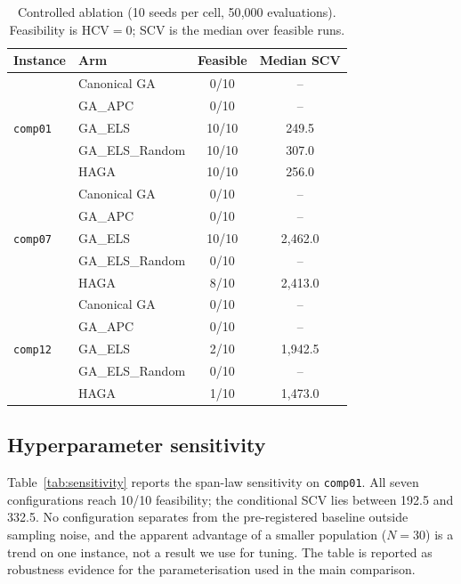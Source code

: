 \documentclass[journal]{IEEEtran}
\newcommand{\code}[1]{\texttt{#1}}
\begin{document}
\begin{table}[!t]
\caption{Controlled ablation (10 seeds per cell, 50{,}000 evaluations). Feasibility is HCV$=0$; SCV is the median over feasible runs.}
\label{tab:ablation}
\centering
\small
\begin{tabular}{ll c c}
\toprule
Instance & Arm & Feasible & Median SCV \\
\midrule
\multirow{5}{*}{\code{comp01}}
& Canonical GA      & 0/10 & -- \\
& GA\_APC           & 0/10 & -- \\
& GA\_ELS           & 10/10 & 249.5 \\
& GA\_ELS\_Random   & 10/10 & 307.0 \\
& HAGA              & 10/10 & 256.0 \\
\midrule
\multirow{5}{*}{\code{comp07}}
& Canonical GA      & 0/10 & -- \\
& GA\_APC           & 0/10 & -- \\
& GA\_ELS           & 10/10 & 2{,}462.0 \\
& GA\_ELS\_Random   & 0/10 & -- \\
& HAGA              & 8/10 & 2{,}413.0 \\
\midrule
\multirow{5}{*}{\code{comp12}}
& Canonical GA      & 0/10 & -- \\
& GA\_APC           & 0/10 & -- \\
& GA\_ELS           & 2/10 & 1{,}942.5 \\
& GA\_ELS\_Random   & 0/10 & -- \\
& HAGA              & 1/10 & 1{,}473.0 \\
\bottomrule
\end{tabular}
\end{table}

\subsection{Hyperparameter sensitivity}
Table~\ref{tab:sensitivity} reports the span-law sensitivity on \code{comp01}. All seven configurations reach 10/10 feasibility; the conditional SCV lies between 192.5 and 332.5. No configuration separates from the pre-registered baseline outside sampling noise, and the apparent advantage of a smaller population ($N=30$) is a trend on one instance, not a result we use for tuning. The table is reported as robustness evidence for the parameterisation used in the main comparison.
\end{document}
